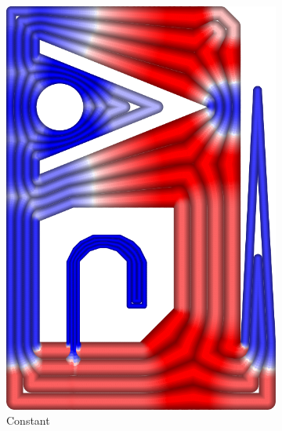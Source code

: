 \begin{figure}
\begin{subfigure}{\figwidth}
\includegraphics[height=\figheight]{sources-validation-gMAT-example-TEST-Constant-widths.png}
\caption{Constant}\label{TEST_Constant_accuracy}
\end{subfigure}
\begin{subfigure}{\figwidth}\centering

\end{subfigure}
\end{figure}
